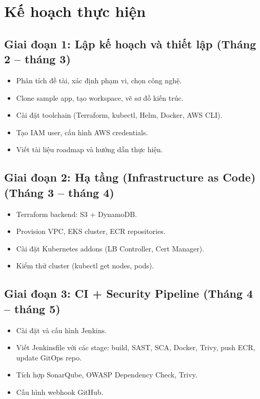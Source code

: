 \documentclass[12pt,a4paper]{article}
\begin{document}
\section{Kế hoạch thực hiện}

\subsection{Giai đoạn 1: Lập kế hoạch và thiết lập (Tháng 2 -- tháng 3)}
\begin{itemize}[leftmargin=*,nosep]
  \item Phân tích đề tài, xác định phạm vi, chọn công nghệ.
  \item Clone sample app, tạo workspace, vẽ sơ đồ kiến trúc.
  \item Cài đặt toolchain (Terraform, kubectl, Helm, Docker, AWS CLI).
  \item Tạo IAM user, cấu hình AWS credentials.
  \item Viết tài liệu roadmap và hướng dẫn thực hiện.
\end{itemize}

\subsection{Giai đoạn 2: Hạ tầng (Infrastructure as Code) (Tháng 3 -- tháng 4)}
\begin{itemize}[leftmargin=*,nosep]
  \item Terraform backend: S3 + DynamoDB.
  \item Provision VPC, EKS cluster, ECR repositories.
  \item Cài đặt Kubernetes addons (LB Controller, Cert Manager).
  \item Kiểm thử cluster (kubectl get nodes, pods).
\end{itemize}

\subsection{Giai đoạn 3: CI + Security Pipeline (Tháng 4 -- tháng 5)}
\begin{itemize}[leftmargin=*,nosep]
  \item Cài đặt và cấu hình Jenkins.
  \item Viết Jenkinsfile với các stage: build, SAST, SCA, Docker, Trivy, push ECR, update GitOps repo.
  \item Tích hợp SonarQube, OWASP Dependency Check, Trivy.
  \item Cấu hình webhook GitHub.
\end{itemize}
\end{document}
